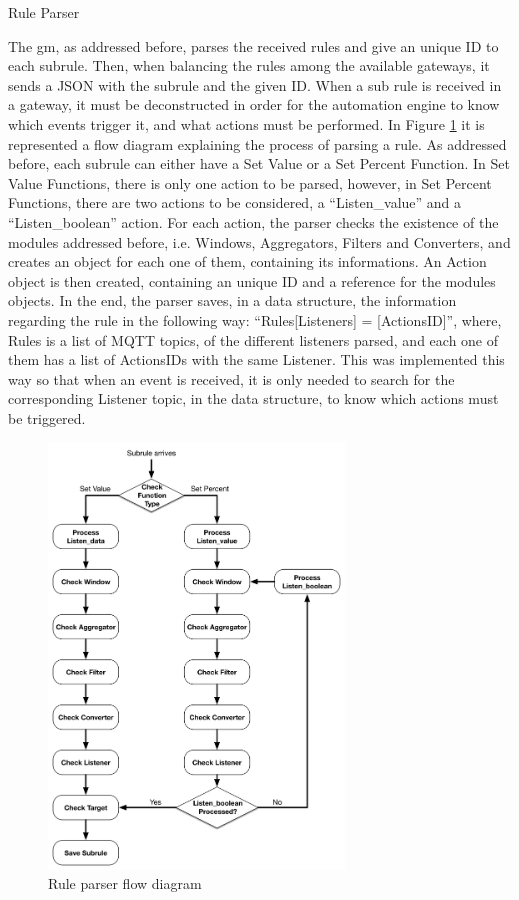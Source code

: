 \begin{Paragraph}{Rule Parser}

The \ac{gm}, as addressed before, parses the received rules and give an unique ID to each subrule. Then, when balancing the rules among the available gateways, it sends a JSON with the subrule and the given ID. When a sub rule is received in a gateway, it must be deconstructed in order for the automation engine to know which events trigger it, and what actions must be performed. In Figure \ref{fig:parse} it is represented a flow diagram explaining the process of parsing a rule. As addressed before, each subrule can either have a Set Value or a Set Percent Function. In Set Value Functions, there is only one action to be parsed, however, in Set Percent Functions, there are two actions to be considered, a ``Listen\_value'' and a ``Listen\_boolean'' action. For each action, the parser checks the existence of the modules addressed before, i.e. Windows, Aggregators, Filters and Converters, and creates an object for each one of them, containing its informations. An Action object is then created, containing an unique ID and a reference for the modules objects. In the end, the parser saves, in a data structure, the information regarding the rule in the following way: ``Rules[Listeners] = [ActionsID]'', where, Rules is a list of MQTT topics, of the different listeners parsed, and each one of them has a list of ActionsIDs with the same Listener. This was implemented this way so that when an event is received, it is only needed to search for the corresponding Listener topic, in the data structure, to know which actions must be triggered. 


\begin{figure}[H]
	\centering
	\includegraphics[width=0.7\textwidth]{figures/parseRule.png}
	\caption{Rule parser flow diagram}
	\label{fig:parse}
\end{figure}

\end{Paragraph}

